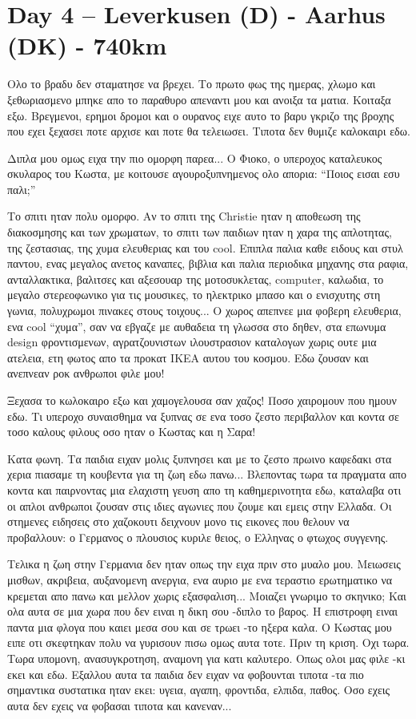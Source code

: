 \chapter{Day 4 -- Leverkusen (D) - Aarhus (DK) - 740km}

Ολο το βραδυ δεν σταματησε να βρεχει. Το πρωτο φως της ημερας, χλωμο και ξεθωριασμενο μπηκε απο το παραθυρο απεναντι μου και ανοιξα τα ματια. Κοιταξα εξω. Βρεγμενοι, ερημοι δρομοι και ο ουρανος ειχε αυτο το βαρυ γκριζο της βροχης που εχει ξεχασει ποτε αρχισε και ποτε θα τελειωσει. Τιποτα δεν θυμιζε καλοκαιρι εδω.

Διπλα μου ομως ειχα την πιο ομορφη παρεα... Ο Φιοκο, ο υπεροχος καταλευκος σκυλαρος του Κωστα, με κοιτουσε αγουροξυπνημενος ολο απορια: ``Ποιος εισαι εσυ παλι;''


Το σπιτι ηταν πολυ ομορφο. Αν το σπιτι της Christie ηταν η αποθεωση της διακοσμησης και των χρωματων, το σπιτι των παιδιων ηταν η χαρα της απλοτητας, της ζεστασιας, της χυμα ελευθεριας και του cool. 
Επιπλα παλια καθε ειδους και στυλ παντου, ενας μεγαλος ανετος καναπες, βιβλια και παλια περιοδικα μηχανης στα ραφια, ανταλλακτικα, βαλιτσες και αξεσουαρ της μοτοσυκλετας, computer, καλωδια, το μεγαλο στερεοφωνικο για τις μουσικες, το ηλεκτρικο μπασο και ο ενισχυτης στη γωνια, πολυχρωμοι πινακες στους τοιχους... 
Ο χωρος απεπνεε μια φοβερη ελευθερια, ενα cool ``χυμα'', σαν να εβγαζε με αυθαδεια τη γλωσσα στο δηθεν, στα επωνυμα design φροντισμενων, αγρατζουνιστων ιλουστρασιον καταλογων χωρις ουτε μια ατελεια, ετη φωτος απο τα προκατ ΙΚΕΑ αυτου του κοσμου. Εδω ζουσαν και ανεπνεαν ροκ ανθρωποι φιλε μου!

Ξεχασα το κωλοκαιρο εξω και χαμογελουσα σαν χαζος! Ποσο χαιρομουν που ημουν εδω. Τι υπεροχο συναισθημα να ξυπνας σε ενα τοσο ζεστο περιβαλλον και κοντα σε τοσο καλους φιλους οσο ηταν ο Κωστας και η Σαρα! 

Κατα φωνη. Tα παιδια ειχαν μολις ξυπνησει και με το ζεστο πρωινο καφεδακι στα χερια πιασαμε τη κουβεντα για τη ζωη εδω πανω... 
Βλεποντας τωρα τα πραγματα απο κοντα και παιρνοντας μια ελαχιστη γευση απο τη καθημερινοτητα εδω, καταλαβα οτι οι απλοι ανθρωποι ζουσαν στις ιδιες αγωνιες που ζουμε και εμεις στην Ελλαδα. Οι στημενες ειδησεις στο χαζοκουτι δειχνουν μονο τις εικονες που θελουν να προβαλλουν: ο Γερμανος ο πλουσιος κυριλε θειος, ο Ελληνας ο φτωχος συγγενης. 

Τελικα η ζωη στην Γερμανια δεν ηταν οπως την ειχα πριν στο μυαλο μου. 
Μειωσεις μισθων, ακριβεια, αυξανομενη ανεργια, ενα αυριο με ενα τεραστιο ερωτηματικο να κρεμεται απο πανω και μελλον χωρις εξασφαλιση... Μοιαζει γνωριμο το σκηνικο; 
Και ολα αυτα σε μια χωρα που δεν ειναι η δικη σου -διπλο το βαρος. Η επιστροφη ειναι παντα μια φλογα που καιει μεσα σου και σε τρωει -το ηξερα καλα. Ο Κωστας μου ειπε οτι σκεφτηκαν πολυ να γυρισουν πισω ομως αυτα τοτε. Πριν τη κριση. Οχι τωρα. 
Τωρα υπομονη, ανασυγκροτηση, αναμονη για κατι καλυτερο. Οπως ολοι μας φιλε -κι εκει και εδω. 
Εξαλλου αυτα τα παιδια δεν ειχαν να φοβουνται τιποτα -τα πιο σημαντικα συστατικα ηταν εκει: υγεια, αγαπη, φροντιδα, ελπιδα, παθος. Οσο εχεις αυτα δεν εχεις να φοβασαι τιποτα και κανεναν...


